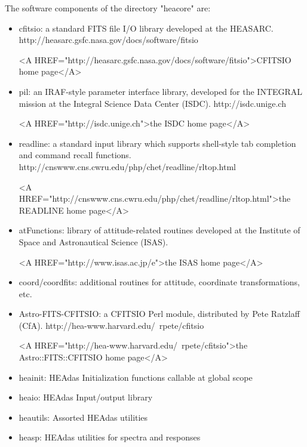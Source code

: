\documentclass[11pt]{book}
\begin{document}
The software components of the directory "heacore" are:
\begin{itemize}

\item cfitsio: a standard FITS file I/O library developed at
the HEASARC. http://heasarc.gsfc.nasa.gov/docs/software/fitsio
\begin{rawhtml}
 <A HREF="http://heasarc.gsfc.nasa.gov/docs/software/fitsio">CFITSIO home page</A>
\end{rawhtml}

\item pil: an IRAF-style parameter interface library, developed for
the INTEGRAL mission at the Integral Science Data Center (ISDC).
http://isdc.unige.ch
\begin{rawhtml}
<A HREF="http://isdc.unige.ch">the ISDC home page</A>
\end{rawhtml}

\item readline: a standard input library which supports shell-style
tab completion and command recall functions.
http://cnswww.cns.cwru.edu/php/chet/readline/rltop.html
\begin{rawhtml}
<A HREF="http://cnswww.cns.cwru.edu/php/chet/readline/rltop.html">the READLINE home page</A>
\end{rawhtml}

\item atFunctions: library of attitude-related routines developed
at the Institute of Space and Astronautical Science (ISAS).
\begin{rawhtml}
<A HREF="http://www.isas.ac.jp/e">the ISAS home page</A>
\end{rawhtml}

\item coord/coordfits: additional routines for attitude, coordinate
transformations, etc.

\item Astro-FITS-CFITSIO: a CFITSIO Perl module, distributed by
Pete Ratzlaff (CfA). http://hea-www.harvard.edu/~rpete/cfitsio
\begin{rawhtml}
<A HREF="http://hea-www.harvard.edu/~rpete/cfitsio">the Astro::FITS::CFITSIO home page</A>
\end{rawhtml}

\item heainit: HEAdas Initialization functions callable at global scope

\item heaio: HEAdas Input/output library

\item heautils: Assorted HEAdas utilities

\item heasp: HEAdas utilities for spectra and responses
\end{itemize}
\end{document}
